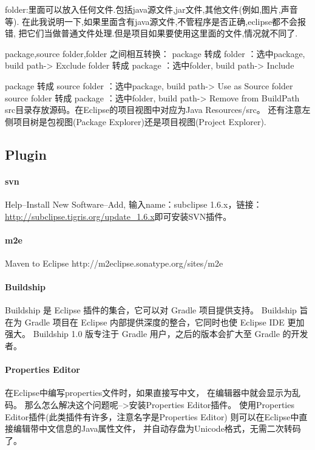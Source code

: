 \documentclass{book}
\begin{document}
folder:里面可以放入任何文件.包括java源文件,jar文件,其他文件(例如,图片,声音等).
在此我说明一下,如果里面含有java源文件,不管程序是否正确,eclipse都不会报错,
把它们当做普通文件处理.但是项目如果要使用这里面的文件,情况就不同了.

package,source folder,folder 之间相互转换：
package 转成 folder ：选中package, build path-> Exclude 
folder 转成 package ：选中folder, build path-> Include

package 转成 source folder ：选中package, build path-> Use as Source folder 
source folder 转成 package ：选中folder, build path-> Remove from BuildPath
src目录存放源码。在Eclipse的项目视图中对应为Java Resources/src。
还有注意左侧项目树是包视图(Package Explorer)还是项目视图(Project Explorer).

\subsection{Plugin}

\paragraph{svn}

Help--Install New Software--Add,
输入name：subclipse 1.6.x，链接：\url{http://subclipse.tigris.org/update_1.6.x}即可安装SVN插件。

\paragraph{m2e}
Maven to Eclipse
http://m2eclipse.sonatype.org/sites/m2e


\paragraph{Buildship}

Buildship 是 Eclipse 插件的集合，它可以对 Gradle 项目提供支持。
Buildship 旨在为 Gradle 项目在 Eclipse 内部提供深度的整合，它同时也使 Eclipse IDE 更加强大。
Buildship 1.0 版专注于 Gradle 用户，之后的版本会扩大至 Gradle 的开发者。

\paragraph{Properties Editor}

在Eclipse中编写properties文件时，如果直接写中文，
在编辑器中就会显示为乱码。
那么怎么解决这个问题呢-->安装Properties Editor插件。
使用Properties Editor插件(此类插件有许多，注意名字是Properties Editor)
则可以在Eclipse中直接编辑带中文信息的Java属性文件，
并自动存盘为Unicode格式，无需二次转码了。
\end{document}
